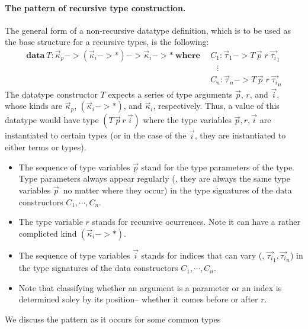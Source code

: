 \paragraph{The pattern of recursive type construction.}
The general form of a non-recursive datatype definition, which is to be used
as the base structure for a recursive types, is the following:
\begin{align*}
\textbf{data}~ T : \vec{\kappa}_p -> (\vec{\kappa}_i -> *) ->
                                      \vec{\kappa}_i -> *
~\textbf{where}~
&~ C_1 : \vec{\tau}_1 -> T\,\vec{p}\;r\;\vec{\tau_i}_{1} \\
&\quad \vdots \\
&~ C_n : \vec{\tau}_n -> T\,\vec{p}\;r\;\vec{\tau_i}_{n}
\end{align*}
The datatype constructor $T$ expects a series of type arguments $\vec{p}$, $r$,
and $\vec{i}$, whose kinds are $\vec{\kappa}_p$, $(\vec{\kappa}_i -> *)$, and
$\vec{\kappa}_i$, respectively. Thus, a value of this datatype would have
type $(T\,\vec{p}\,r\,\vec{i})$ where the type variables $\vec{p},r,\vec{i}$
are instantiated to certain types (or in the case of the $\vec{i}$, they are instantiated to either terms or types).
\begin{itemize}
\item The sequence of type variables $\vec{p}$ stand for the type parameters of the
type. Type parameters always appear regularly 
(\ie, they are always the same type variables $\vec{p}$\
no matter where they occur) in the type siguatures of
the data constructors $C_1,\cdots,C_n$. 

\item The type variable $r$ stands for
recursive ocurrences. Note it can have a rather complicted kind $(\vec{\kappa}_i -> *)$.

\item The sequence of type variables $\vec{i}$ stands for indices
that can vary (\eg, $\vec{\tau_i}_1,\vec{\tau_i}_n$) in the type signatures of
the data constructors $C_1,\cdots,C_n$. 

\item Note that classifying whether an argument is a parameter or an index is
determined soley by its position-- whether it comes before or after $r$.

\end{itemize}
We discuss the pattern as it occurs for some common types
